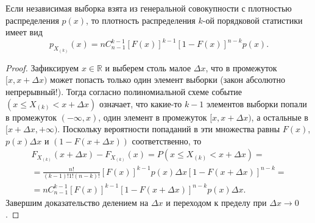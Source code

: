 \begin{theorem}
	Если независимая выборка взята из генеральной совокупности с
плотностью распределения $p(x)$, то плотность распределения $k$-ой порядковой
статистики имеет вид 
\[
	p_{X_{(k)}}(x) = n C^{k-1}_{n-1} \left[ F(x) \right]^{k-1} [1 - F(x)]^{n-k}
	p(x).
\]
\end{theorem}
\begin{proof}
Зафиксируем $ x \in \mathbb R $ и выберем столь малое $ \Delta x $, что в
промежуток $ [x, x+ \Delta x) $ может попасть только один элемент выборки (закон
абсолютно непрерывный!). Тогда согласно полиномиальной схеме событие 
$(x \leqslant X_{(k)} < x + \Delta x)$ означает, что какие-то $ k - 1 $ элементов
выборки попали в промежуток $ (-\infty, x) $, 
один элемент в промежуток $[x, x + \Delta x)$, а остальные в $[x + \Delta x,
+\infty)$. Поскольку вероятности 
попаданий в эти множества равны $ F(x) $, $ p(x)\Delta x $ и $(1 - F(x + \Delta
x))$ соответственно, то  
\begin{multline*}
	F_{X_{(k)}}(x+\Delta x) - F_{X_{(k)}} (x) = P(x \leqslant X_{(k)} < x + \Delta
	x) = \\ =
	\frac{n!}{(k-1)!1!(n-k)!} [F(x)]^{k-1} p(x) \Delta x [1 - F(x + \Delta
	x)]^{n-k} = \\ =
	n C^{k-1}_{n-1} [F(x)]^{k-1} [1 - F(x + \Delta x)]^{n-k} p(x)\Delta x.
\end{multline*}
Завершим доказательство делением на $ \Delta x $ и переходом к пределу при $
\Delta x \to 0 $.

\end{proof}



